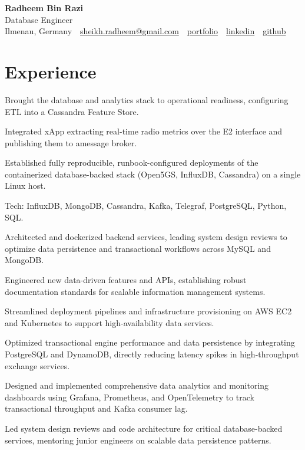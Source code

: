 \documentclass[10pt,a4paper]{resume}
\makeatletter
\newcommand{\Portfolio}{https://radheem.github.io/my-cv}
\newcommand{\PortfolioText}{portfolio}
\newcommand{\GitHub}{https://github.com/radheem}
\newcommand{\LinkedIn}{https://www.linkedin.com/in/radheem-razi}
\newcommand{\Email}{sheikh.radheem@gmail.com}
\makeatother
\begin{document}
\begin{center}
  {\huge\bfseries Radheem Bin Razi}\\[3pt]
  {\large Database Engineer}\\[6pt]
  \small
  Ilmenau, Germany \,\textbar\,
  \href{mailto:\Email}{\Email} \,\textbar\,
  \href{\Portfolio}{\PortfolioText} \,\textbar\,
  \href{\LinkedIn}{linkedin} \,\textbar\,
  \href{\GitHub}{github}
\end{center}
\vspace{2pt}

\section{Experience}

\bullets
  \item Brought the database and analytics stack to operational readiness, configuring ETL into a Cassandra Feature Store.
  \item Integrated xApp extracting real-time radio metrics over the E2 interface and publishing them to amessage broker.
  \item Established fully reproducible, runbook-configured deployments of the containerized database-backed stack (Open5GS, InfluxDB, Cassandra) on a single Linux host.
  \item Tech: InfluxDB, MongoDB, Cassandra, Kafka, Telegraf, PostgreSQL, Python, SQL.
\bulletsend
\vspace{1.5pt}
\bullets
  \item Architected and dockerized backend services, leading system design reviews to optimize data persistence and transactional workflows across MySQL and MongoDB.
  \item Engineered new data-driven features and APIs, establishing robust documentation standards for scalable information management systems.
  \item Streamlined deployment pipelines and infrastructure provisioning on AWS EC2 and Kubernetes to support high-availability data services.
\bulletsend
\vspace{1.5pt}
\bullets
  \item Optimized transactional engine performance and data persistence by integrating PostgreSQL and DynamoDB, directly reducing latency spikes in high-throughput exchange services.
  \item Designed and implemented comprehensive data analytics and monitoring dashboards using Grafana, Prometheus, and OpenTelemetry to track transactional throughput and Kafka consumer lag.
  \item Led system design reviews and code architecture for critical database-backed services, mentoring junior engineers on scalable data persistence patterns.
\bulletsend
\vspace{1.5pt}
\end{document}
